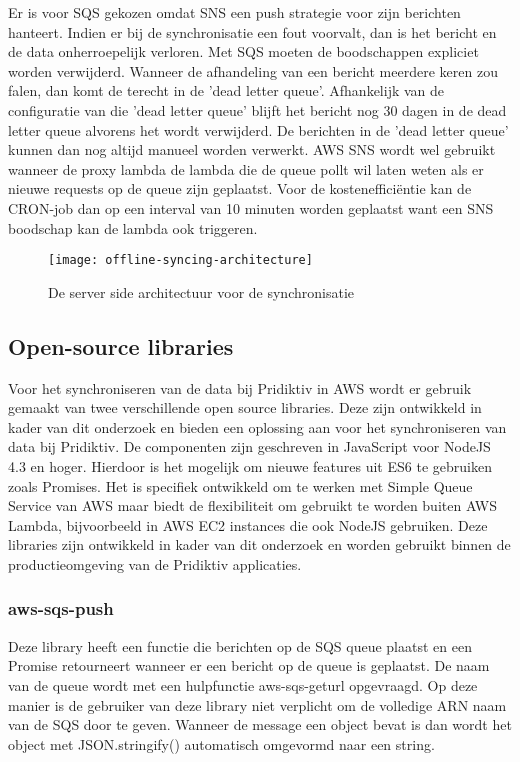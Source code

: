 Er is voor SQS gekozen omdat SNS een push strategie voor zijn berichten hanteert. Indien er bij de synchronisatie een fout voorvalt, dan is het bericht en de data onherroepelijk verloren. Met SQS moeten de boodschappen expliciet worden verwijderd. 
\clearpage
Wanneer de afhandeling van een bericht meerdere keren zou falen, dan komt de  terecht in de 'dead letter queue'. Afhankelijk van de configuratie van die 'dead letter queue' blijft het bericht nog 30 dagen in de dead letter queue alvorens het wordt verwijderd. De berichten in de 'dead letter queue' kunnen dan nog altijd manueel worden verwerkt. AWS SNS wordt wel gebruikt wanneer de proxy lambda de lambda die de queue pollt wil laten weten als er nieuwe requests op de queue zijn geplaatst. Voor de kosteneffici\"entie kan de CRON-job dan op een interval van 10 minuten worden geplaatst want een SNS boodschap kan de lambda ook triggeren.

\begin{figure}[h]
\caption{De server side architectuur voor de synchronisatie}
\centering
\texttt{[image: offline-syncing-architecture]}
\end{figure}

\subsection{Open-source libraries}
Voor het synchroniseren van de data bij Pridiktiv in AWS wordt er gebruik gemaakt van twee verschillende open source libraries. Deze zijn ontwikkeld in kader van dit onderzoek en bieden een oplossing aan voor het synchroniseren van data bij Pridiktiv. De componenten zijn geschreven in JavaScript voor NodeJS 4.3 en hoger. Hierdoor is het mogelijk om nieuwe features uit ES6 te gebruiken zoals Promises. Het is specifiek ontwikkeld om te werken met Simple Queue Service van AWS maar biedt de flexibiliteit om gebruikt te worden buiten AWS Lambda, bijvoorbeeld in AWS EC2 instances die ook NodeJS gebruiken. Deze libraries zijn ontwikkeld in kader van dit onderzoek en worden gebruikt binnen de productieomgeving van de Pridiktiv applicaties.
\subsubsection{aws-sqs-push}
Deze library heeft een functie die berichten op de SQS queue plaatst en een Promise retourneert wanneer er een bericht op de queue is geplaatst. De naam van de queue wordt met een hulpfunctie aws-sqs-geturl opgevraagd. Op deze manier is de gebruiker van deze library niet verplicht om de volledige ARN naam van de SQS door te geven. Wanneer de message een object bevat is dan wordt het object met JSON.stringify() automatisch omgevormd naar een string.
\clearpage

